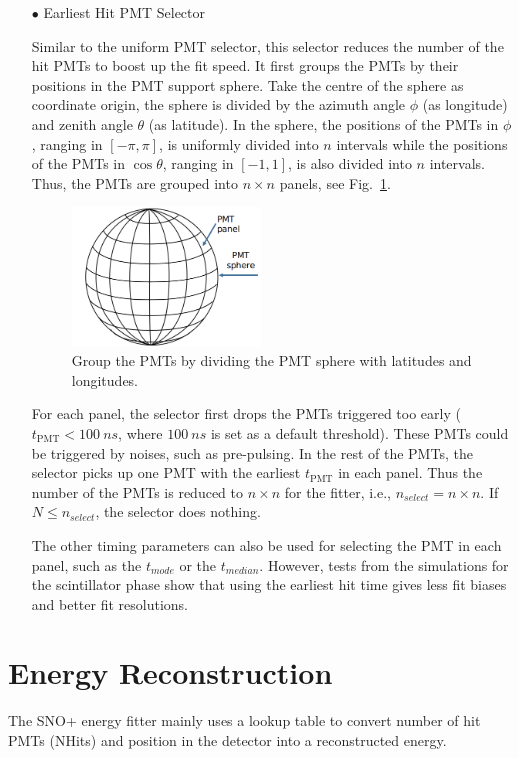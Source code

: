 \begin{itemize}
	\item[$\bullet$] Earliest Hit PMT Selector
	
	Similar to the uniform PMT selector, this selector reduces the number of the hit PMTs to boost up the fit speed. It first groups the PMTs by their positions in the PMT support sphere. Take the centre of the sphere as coordinate origin, the sphere is divided by the azimuth angle $\phi$ (as longitude) and zenith angle $\theta$ (as latitude). In the sphere, the positions of the PMTs in $\phi$, ranging in $[-\pi,\pi]$, is uniformly divided into $n$ intervals while the positions of the PMTs in $\cos\theta$, ranging in $[-1, 1]$, is also divided into $n$ intervals. Thus, the PMTs are grouped into $n\times n$ panels, see Fig.~\ref{GroupPMTs}. 
	\begin{figure}[!htb]
		\centering
		\includegraphics[width=5cm]{GroupPMTs.png}
		\caption{Group the PMTs by dividing the PMT sphere with latitudes and longitudes.}
		\label{GroupPMTs}
	\end{figure}
	
	For each panel, the selector first drops the PMTs triggered too early ($t_\mathrm{PMT}<100~ns$, where $100~ns$ is set as a default threshold). These PMTs could be triggered by noises, such as pre-pulsing. In the rest of the PMTs, the selector picks up one PMT with the earliest $t_\mathrm{PMT}$ in each panel. Thus the number of the PMTs is reduced to $n\times n$ for the fitter, i.e., $n_{select}=n\times n$. If $N\leq n_{select}$, the selector does nothing. 
	
	The other timing parameters can also be used for selecting the PMT in each panel, such as the $t_{mode}$ or the $t_{median}$. However, tests from the simulations for the scintillator phase show that using the earliest hit time gives less fit biases and better fit resolutions.
\end{itemize}

\section{Energy Reconstruction}
The SNO+ energy fitter mainly uses a lookup table to convert number of hit PMTs (NHits) and position in the detector into a reconstructed energy.

